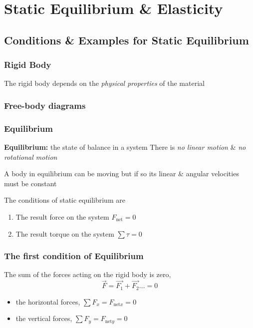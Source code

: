 

\setcounter{chapter}{1}
\chapter{Static Equilibrium \& Elasticity}
\section{Conditions \& Examples for Static Equilibrium}
\subsection{Rigid Body}

The rigid body depends on the \emph{physical properties} of the material

\subsection{Free-body diagrams}
\subsection{Equilibrium}

\textbf{Equilibrium:} the state of balance in a system
There is \emph{no linear motion} \& \emph{no rotational motion}

A body in equilibrium can be moving
but if so its linear \& angular velocities must be constant

The conditions of static equilibrium are
\begin{enumerate}
	\item The result force on the system \( F_{\text{net}} = 0 \)
	\item The result torque on the system \( \sum\tau = 0 \)
\end{enumerate}

\subsection{The first condition of Equilibrium}
The sum of the forces acting on the rigid body is zero,
\[
	\vec{F} = \vec{F_1} + \vec{F_2} \ldots = 0
\]
\begin{itemize}
	\item	the horizontal forces, \( \sum F_x = F_{\text{net}x} = 0 \)
	\item	the vertical forces,   \( \sum F_y = F_{\text{net}y} = 0 \)
\end{itemize}

